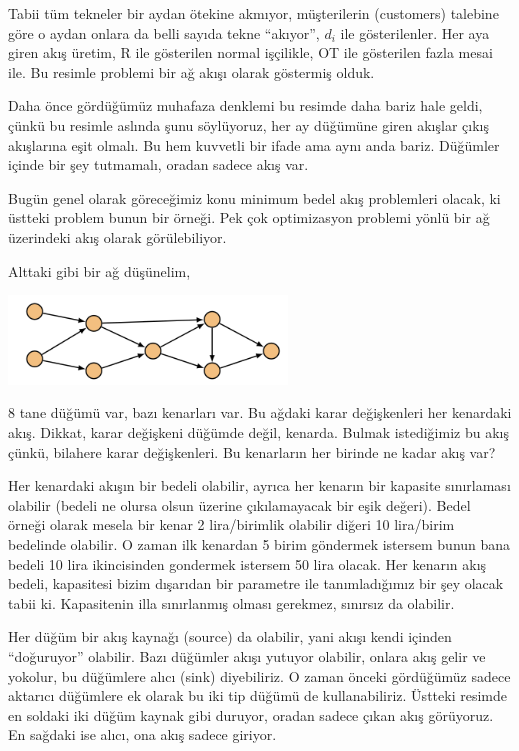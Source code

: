 \documentclass[12pt,fleqn]{article}\usepackage{../../common}
\begin{document}
Tabii tüm tekneler bir aydan ötekine akmıyor, müşterilerin (customers)
talebine göre o aydan onlara da belli sayıda tekne ``akıyor'', $d_i$ ile
gösterilenler. Her aya giren akış üretim, R ile gösterilen normal
işçilikle, OT ile gösterilen fazla mesai ile.  Bu resimle problemi bir ağ
akışı olarak göstermiş olduk.

Daha önce gördüğümüz muhafaza denklemi bu resimde daha bariz hale geldi,
çünkü bu resimle aslında şunu söylüyoruz, her ay düğümüne giren akışlar
çıkış akışlarına eşit olmalı. Bu hem kuvvetli bir ifade ama aynı anda
bariz. Düğümler içinde bir şey tutmamalı, oradan sadece akış var. 

Bugün genel olarak göreceğimiz konu minimum bedel akış problemleri olacak,
ki üstteki problem bunun bir örneği. Pek çok optimizasyon problemi yönlü
bir ağ üzerindeki akış olarak görülebiliyor. 

Alttaki gibi bir ağ düşünelim,

\includegraphics[width=20em]{func_90_nflow_02.png}

8 tane düğümü var, bazı kenarları var. Bu ağdaki karar değişkenleri her
kenardaki akış. Dikkat, karar değişkeni düğümde değil, kenarda. Bulmak
istediğimiz bu akış çünkü, bilahere karar değişkenleri. Bu kenarların her
birinde ne kadar akış var? 

Her kenardaki akışın bir bedeli olabilir, ayrıca her kenarın bir kapasite
sınırlaması olabilir (bedeli ne olursa olsun üzerine çıkılamayacak bir eşik
değeri). Bedel örneği olarak mesela bir kenar 2 lira/birimlik olabilir
diğeri 10 lira/birim bedelinde olabilir. O zaman ilk kenardan 5 birim
göndermek istersem bunun bana bedeli 10 lira ikincisinden gondermek
istersem 50 lira olacak. Her kenarın akış bedeli, kapasitesi bizim
dışarıdan bir parametre ile tanımladığımız bir şey olacak tabii
ki. Kapasitenin illa sınırlanmış olması gerekmez, sınırsız da olabilir.

Her düğüm bir akış kaynağı (source) da olabilir, yani akışı kendi içinden
``doğuruyor'' olabilir. Bazı düğümler akışı yutuyor olabilir, onlara akış
gelir ve yokolur, bu düğümlere alıcı (sink) diyebiliriz. O zaman önceki
gördüğümüz sadece aktarıcı düğümlere ek olarak bu iki tip düğümü de
kullanabiliriz. Üstteki resimde en soldaki iki düğüm kaynak gibi duruyor,
oradan sadece çıkan akış görüyoruz. En sağdaki ise alıcı, ona akış sadece
giriyor. 
\end{document}
